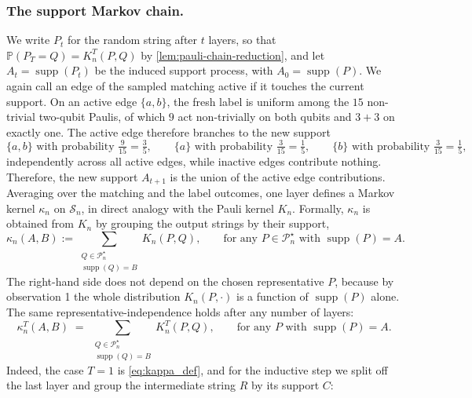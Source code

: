 \documentclass[
    aps,
    superscriptaddress,
    onecolumn,
    10pt,
    prx,
    nofootinbib
]{revtex4-2}
\theoremstyle{namedstatement}
\theoremstyle{plain}
\begin{document}
\subsubsection{The support Markov chain.}
We write $P_t$ for the random string after $t$ layers, so that $\mathbb{P}(P_T = Q) = K_n^{T}(P,Q)$ by \cref{lem:pauli-chain-reduction}, and let $A_t = \operatorname{supp}(P_t)$ be the induced support process, with $A_0 = \operatorname{supp}(P)$. We again call an edge of the sampled matching active if it touches the current support. On an active edge $\{a,b\}$, the fresh label is uniform among the $15$ non-trivial two-qubit Paulis, of which $9$ act non-trivially on both qubits and $3+3$ on exactly one. The active edge therefore branches to the new support
\begin{equation}\label{eq:edge_rule}
    \{a,b\} \text{ with probability } \tfrac{9}{15}=\tfrac{3}{5},
    \qquad
    \{a\} \text{ with probability } \tfrac{3}{15}=\tfrac{1}{5},
    \qquad
    \{b\} \text{ with probability } \tfrac{3}{15}=\tfrac{1}{5},
\end{equation}
independently across all active edges, while inactive edges contribute nothing. Therefore, the new support $A_{t+1}$ is the union of the active edge contributions. Averaging over the matching and the label outcomes, one layer defines a Markov kernel $\kappa_n$ on $\mathcal{S}_n$, in direct analogy with the Pauli kernel $K_n$. Formally, $\kappa_n$ is obtained from $K_n$ by grouping the output strings by their support,
\begin{equation}\label{eq:kappa_def}
    \kappa_n(A, B)
    := \sum_{\substack{Q \in \mathcal{P}_n^\star \\ \operatorname{supp}(Q) = B}} K_n(P, Q),
    \qquad \text{for any } P \in \mathcal{P}_n^\star \text{ with } \operatorname{supp}(P) = A.
\end{equation}
The right-hand side does not depend on the chosen representative $P$, because by observation 1 the whole distribution $K_n(P,\cdot)$ is a function of $\operatorname{supp}(P)$ alone. The same representative-independence holds after any number of layers:
\begin{equation}\label{eq:kappa_T_classsum}
    \kappa_n^{T}(A,B) \;=\; \sum_{\substack{Q \in \mathcal{P}_n^\star\\ \operatorname{supp}(Q)=B}} K_n^{T}(P,Q),
    \qquad \text{for any } P \text{ with } \operatorname{supp}(P)=A.
\end{equation}
Indeed, the case $T = 1$ is \cref{eq:kappa_def}, and for the inductive step we split off the last layer and group the intermediate string $R$ by its support $C$:
\end{document}
